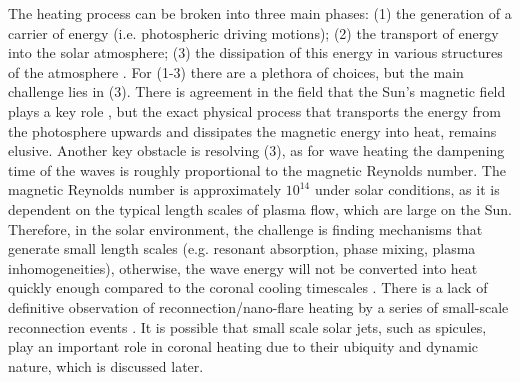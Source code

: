 %
The heating process can be broken into three main phases: (1) the generation of a carrier of energy (i.e. photospheric driving motions); (2) the transport of energy into the solar atmosphere; (3) the dissipation of this energy in various structures of the atmosphere \citep{Wentzel1974SoPh39129W, Robert2004AG45d34E}. For (1-3) there are a plethora of choices, but the main challenge lies in (3). There is agreement in the field that the Sun's magnetic field plays a key role \citep{Parnell2012RSPTA3703217P, Arregui2015RSPTA37340261A}, but the exact physical process that transports the energy from the photosphere upwards and dissipates the magnetic energy into heat, remains elusive. Another key obstacle is resolving (3), as for wave heating the dampening time of the waves is roughly proportional to the magnetic Reynolds number. The magnetic Reynolds number is approximately  $10^{14}$ under solar conditions, as it is dependent on the typical length scales of plasma flow, which are large on the Sun. Therefore, in the solar environment, the challenge is finding mechanisms that generate small length scales (e.g. resonant absorption, phase mixing, plasma inhomogeneities), otherwise, the wave energy will not be converted into heat quickly enough compared to the coronal cooling timescales \citep{Doorsselaere2020SSRv216140V}. There is a lack of definitive observation of reconnection/nano-flare heating by a series of small-scale reconnection events \citep{Hudson1991SoPh133357H, Parnell2012RSPTA3703217P}. It is possible that small scale solar jets, such as spicules, play an important role in coronal heating due to their ubiquity and dynamic nature, which is discussed later.
